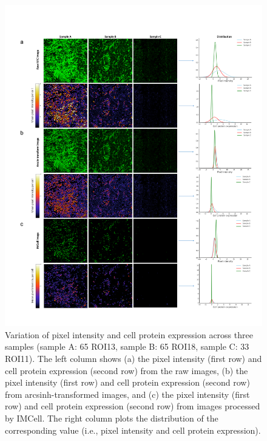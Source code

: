 \documentclass{mynature}
\begin{document}
\begin{figure}[!htb]
  \centering
  \includegraphics[width=0.9\linewidth]{Figure/Figure3.pdf}
  \caption{Variation of pixel intensity and cell protein expression across three samples (sample A: 65 ROI13, sample B: 65 ROI18, sample C: 33 ROI11). 
  The left column shows (a) the pixel intensity (first row) and cell protein expression (second row) from the raw images, (b) the pixel intensity (first row) and cell protein expression (second row) from arcsinh-transformed images, and (c) the pixel intensity (first row) and cell protein expression (second row) from images processed by IMCell. The right column plots the distribution of the corresponding value (i.e., pixel intensity and cell protein expression). 
  }
  \label{fig3:imcell}
\end{figure}
\end{document}
